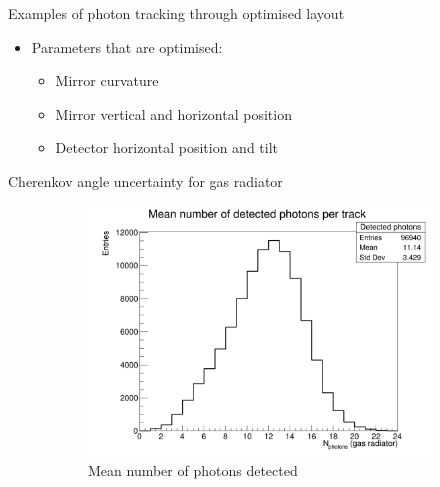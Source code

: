 \documentclass{beamer}
\begin{document}
\begin{frame}{Examples of photon tracking through optimised layout}
\begin{figure}
  \end{figure}
  \vspace{-0.3cm}
  \begin{itemize}
    \item{Parameters that are optimised:}
    \begin{itemize}
      \item{Mirror curvature}
      \item{Mirror vertical and horizontal position}
      \item{Detector horizontal position and tilt}
    \end{itemize}
  \end{itemize}
\end{frame}

\begin{frame}{Cherenkov angle uncertainty for gas radiator}
  \begin{figure}
    \centering
    \vspace{-0.2cm}
    \begin{subfigure}{0.35\textwidth}
      \includegraphics[width = 1.0\textwidth]{Plots/NumberDetectedPhotons_Barrel_Gas.png}
      \vspace{-0.75cm}
      \caption{Mean number of photons detected}
    \end{subfigure}
    \begin{subfigure}{0.35\textwidth}

\end{subfigure}
\end{figure}
\end{frame}
\end{document}
